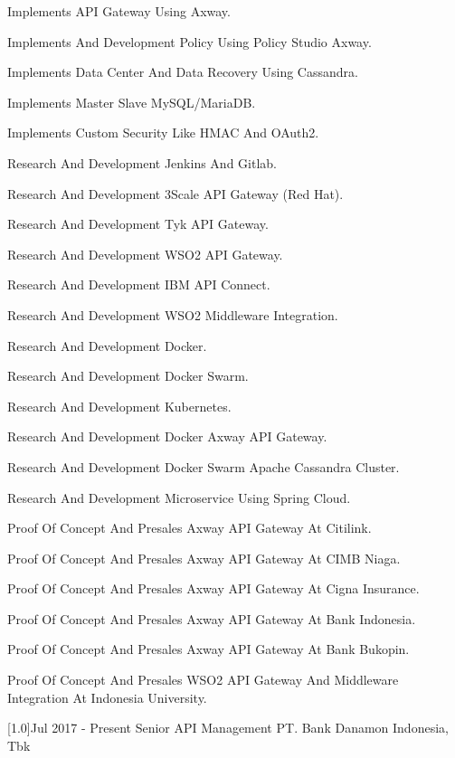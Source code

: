 \documentclass[english]{cv-style}
\begin{document}
\begin{entrylist}
{\begin{itemize}
{    \item Implements API Gateway Using Axway.
    \item Implements And Development Policy Using Policy Studio Axway.
    \item Implements Data Center And Data Recovery Using Cassandra.
    \item Implements Master Slave MySQL/MariaDB.
    \item Implements Custom Security Like HMAC And OAuth2.
    \item Research And Development Jenkins And Gitlab.
    \item Research And Development 3Scale API Gateway (Red Hat).
    \item Research And Development Tyk API Gateway.
    \item Research And Development WSO2 API Gateway.
    \item Research And Development IBM API Connect.
    \item Research And Development WSO2 Middleware Integration.
    \item Research And Development Docker.
    \item Research And Development Docker Swarm.
    \item Research And Development Kubernetes.
    \item Research And Development Docker Axway API Gateway.
    \item Research And Development Docker Swarm Apache Cassandra Cluster.
    \item Research And Development Microservice Using Spring Cloud.
    \item Proof Of Concept And Presales Axway API Gateway At Citilink.
    \item Proof Of Concept And Presales Axway API Gateway At CIMB Niaga.
    \item Proof Of Concept And Presales Axway API Gateway At Cigna Insurance.
    \item Proof Of Concept And Presales Axway API Gateway At Bank Indonesia.
    \item Proof Of Concept And Presales Axway API Gateway At Bank Bukopin.
    \item Proof Of Concept And Presales WSO2 API Gateway And Middleware Integration At Indonesia University.}
  \end{itemize}}
\entry
  {\scalebox{.6}[1.0]{Jul 2017 - Present}}
  {Senior API Management}
  {PT. Bank Danamon Indonesia, Tbk}
  {\vspace{-0.3cm}}
\end{entrylist}
\end{document}
